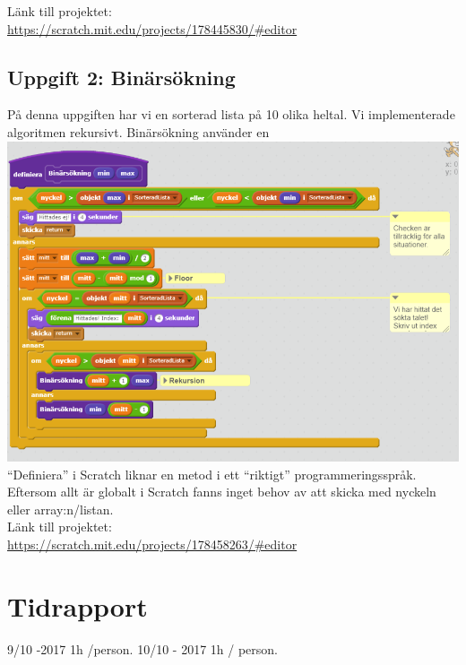 \documentclass[12pt,a4paper]{article}
\begin{document}

Länk till projektet:  \\
 \url{https://scratch.mit.edu/projects/178445830/#editor }
\subsection{Uppgift 2: Binärsökning}
På denna uppgiften har vi en sorterad lista på 10 olika heltal.
Vi implementerade algoritmen rekursivt. Binärsökning använder en  \\
\includegraphics[scale=0.65]{binaryimpl}
\\ ``Definiera'' i Scratch liknar en metod i ett ``riktigt'' programmeringsspråk. Eftersom allt är globalt i Scratch fanns inget behov av att skicka med nyckeln eller array:n/listan.   \\
Länk till projektet: \\ \url{ https://scratch.mit.edu/projects/178458263/#editor }
\section{Tidrapport}
9/10 -2017 1h /person. 
10/10 - 2017 1h / person. 
\end{document}
